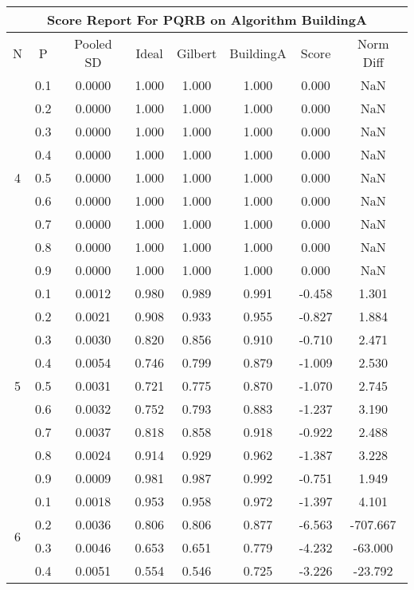 \documentclass[11pt,a4paper]{report}
\begin{document}
\begin{longtable}{ | c | c || c | c | c | c | c | c | }
\hline
\multicolumn{8}{|c|}{ Score Report For PQRB on Algorithm BuildingA} \\
\hline
N & P & Pooled SD &  Ideal &  Gilbert & BuildingA  & Score & Norm Diff \\
 \hline
 \hline
 \endhead
\multirow{9}{*}{4} & 0.1 & 0.0000 & 1.000 & 1.000 & 1.000 & 0.000 & NaN \\
 & 0.2 & 0.0000 & 1.000 & 1.000 & 1.000 & 0.000 & NaN \\
 & 0.3 & 0.0000 & 1.000 & 1.000 & 1.000 & 0.000 & NaN \\
 & 0.4 & 0.0000 & 1.000 & 1.000 & 1.000 & 0.000 & NaN \\
 & 0.5 & 0.0000 & 1.000 & 1.000 & 1.000 & 0.000 & NaN \\
 & 0.6 & 0.0000 & 1.000 & 1.000 & 1.000 & 0.000 & NaN \\
 & 0.7 & 0.0000 & 1.000 & 1.000 & 1.000 & 0.000 & NaN \\
 & 0.8 & 0.0000 & 1.000 & 1.000 & 1.000 & 0.000 & NaN \\
 & 0.9 & 0.0000 & 1.000 & 1.000 & 1.000 & 0.000 & NaN \\
 \hline
\multirow{9}{*}{5} & 0.1 & 0.0012 & 0.980 & 0.989 & 0.991 & -0.458 & 1.301 \\
 & 0.2 & 0.0021 & 0.908 & 0.933 & 0.955 & -0.827 & 1.884 \\
 & 0.3 & 0.0030 & 0.820 & 0.856 & 0.910 & -0.710 & 2.471 \\
 & 0.4 & 0.0054 & 0.746 & 0.799 & 0.879 & -1.009 & 2.530 \\
 & 0.5 & 0.0031 & 0.721 & 0.775 & 0.870 & -1.070 & 2.745 \\
 & 0.6 & 0.0032 & 0.752 & 0.793 & 0.883 & -1.237 & 3.190 \\
 & 0.7 & 0.0037 & 0.818 & 0.858 & 0.918 & -0.922 & 2.488 \\
 & 0.8 & 0.0024 & 0.914 & 0.929 & 0.962 & -1.387 & 3.228 \\
 & 0.9 & 0.0009 & 0.981 & 0.987 & 0.992 & -0.751 & 1.949 \\
 \hline
\multirow{9}{*}{6} & 0.1 & 0.0018 & 0.953 & 0.958 & 0.972 & -1.397 & 4.101 \\
 & 0.2 & 0.0036 & 0.806 & 0.806 & 0.877 & -6.563 & -707.667 \\
 & 0.3 & 0.0046 & 0.653 & 0.651 & 0.779 & -4.232 & -63.000 \\
 & 0.4 & 0.0051 & 0.554 & 0.546 & 0.725 & -3.226 & -23.792 \\

\end{longtable}
\end{document}
